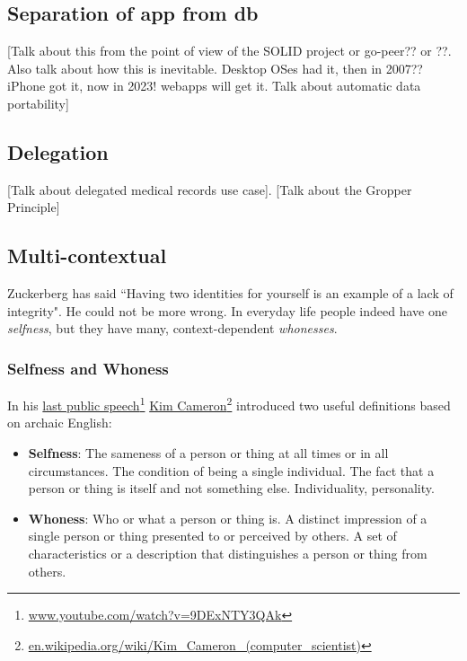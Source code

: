 \documentclass[11pt, oneside]{article}   	%
\newcommand{\hyperfootnote}[1][]{\def\ArgI{{#1}}\hyperfootnoteRelay}
\newcommand\hyperfootnoteRelay[2][]{\href{#1#2}{\ArgI}\footnote{\href{#1#2}{#2}}}
\begin{document}
\subsection{Separation of app from db}

[Talk about this from the point of view of the SOLID project or go-peer?? or ??. Also talk about how this is inevitable. Desktop OSes had it, then in 2007?? iPhone got it, now in 2023! webapps will get it. Talk about automatic data portability]

\subsection{Delegation}

[Talk about delegated medical records use case]. [Talk about the Gropper Principle]

\subsection{Multi-contextual}

Zuckerberg has said ``Having two identities for yourself is an example of a lack of integrity"\cite{Kirkpatrick2011}. He could not be more wrong. In everyday life people indeed have one \emph{selfness}, but they have many, context-dependent \emph{whonesses}.

\subsubsection{Selfness and Whoness}

In his \hyperfootnote[last public speech][https://]{www.youtube.com/watch?v=9DExNTY3QAk}  
\hyperfootnote[Kim Cameron][https://]{en.wikipedia.org/wiki/Kim\_Cameron\_(computer\_scientist)} introduced two useful definitions based on archaic English:

\begin{itemize}
\item \textbf{Selfness}: The sameness of a person or thing at all times or in all circumstances. The condition of being a single individual. The fact that a person or thing is itself and not something else. Individuality, personality. 
\item \textbf{Whoness}: Who or what a person or thing is. A distinct impression of a single person or thing presented to or perceived by others. A set of characteristics or a description that distinguishes a person or thing from others. 
\end{itemize}
\end{document}
